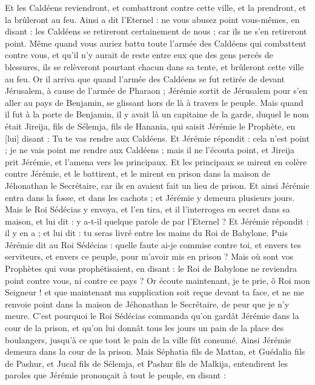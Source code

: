 \begin{multicols}{2}
Et les Caldéens reviendront, et combattront contre cette ville, et la prendront, et la brûleront au feu.
Ainsi a dit l'Eternel : ne vous abusez point vous-mêmes, en disant : les Caldéens se retireront certainement de nous ; car ils ne s'en retireront point.
Même quand vous auriez battu toute l'armée des Caldéens qui combattent contre vous, et qu'il n'y aurait de reste entre eux que des gens percés de blessures, ils se relèveront pourtant chacun dans sa tente, et brûleront cette ville au feu.
Or il arriva que quand l'armée des Caldéens se fut retirée de devant Jérusalem, à cause de l'armée de Pharaon ;
Jérémie sortit de Jérusalem pour s'en aller au pays de Benjamin, se glissant hors de là à travers le peuple.
Mais quand il fut à la porte de Benjamin, il y avait là un capitaine de la garde, duquel le nom était Jireija, fils de Sélemja, fils de Hanania, qui saisit Jérémie le Prophète, en [lui] disant : Tu te vas rendre aux Caldéens.
Et Jérémie répondit : cela n'est point ; je ne vais point me rendre aux Caldéens ; mais il ne l'écouta point, et Jireija prit Jérémie, et l'amena vers les principaux.
Et les principaux se mirent en colère contre Jérémie, et le battirent, et le mirent en prison dans la maison de Jéhonathan le Secrétaire, car ils en avaient fait un lieu de prison.
Et ainsi Jérémie entra dans la fosse, et dans les cachots ; et Jérémie y demeura plusieurs jours.
Mais le Roi Sédécias y envoya, et l'en tira, et il l'interrogea en secret dans sa maison, et lui dit : y a-t-il quelque parole de par l'Eternel ? Et Jérémie répondit : il y en a ; et lui dit : tu seras livré entre les mains du Roi de Babylone.
Puis Jérémie dit au Roi Sédécias : quelle faute ai-je commise contre toi, et envers tes serviteurs, et envers ce peuple, pour m'avoir mis en prison ?
Mais où sont vos Prophètes qui vous prophétisaient, en disant : le Roi de Babylone ne reviendra point contre vous, ni contre ce pays ?
Or écoute maintenant, je te prie, ô Roi mon Seigneur ! et que maintenant ma supplication soit reçue devant ta face, et ne me renvoie point dans la maison de Jéhonathan le Secrétaire, de peur que je n'y meure.
C'est pourquoi le Roi Sédécias commanda qu'on gardât Jérémie dans la cour de la prison, et qu'on lui donnât tous les jours un pain de la place des boulangers, jusqu’à ce que tout le pain de la ville fût consumé. Ainsi Jérémie demeura dans la cour de la prison.
\VerseOne{}Mais Séphatia fils de Mattan, et Guédalia fils de Pashur, et Jucal fils de Sélemja, et Pashur fils de Malkija, entendirent les paroles que Jérémie prononçait à tout le peuple, en disant :

\end{multicols}
